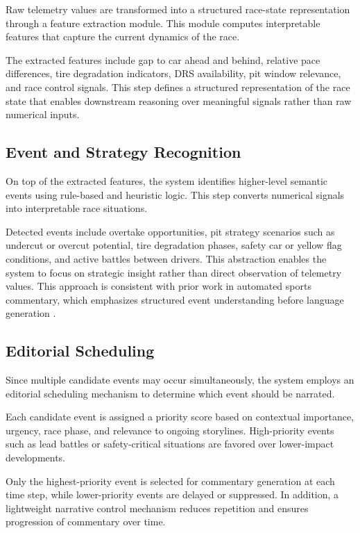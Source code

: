 Raw telemetry values are transformed into a structured race-state representation through a feature extraction module. This module computes interpretable features that capture the current dynamics of the race.

The extracted features include gap to car ahead and behind, relative pace differences, tire degradation indicators, DRS availability, pit window relevance, and race control signals. This step defines a structured representation of the race state that enables downstream reasoning over meaningful signals rather than raw numerical inputs.

\subsection{Event and Strategy Recognition}

On top of the extracted features, the system identifies higher-level semantic events using rule-based and heuristic logic. This step converts numerical signals into interpretable race situations.

Detected events include overtake opportunities, pit strategy scenarios such as undercut or overcut potential, tire degradation phases, safety car or yellow flag conditions, and active battles between drivers. This abstraction enables the system to focus on strategic insight rather than direct observation of telemetry values. This approach is consistent with prior work in automated sports commentary, which emphasizes structured event understanding before language generation \cite{AutoBaseComm,AutoBaskComm}.

\subsection{Editorial Scheduling}

Since multiple candidate events may occur simultaneously, the system employs an editorial scheduling mechanism to determine which event should be narrated.

Each candidate event is assigned a priority score based on contextual importance, urgency, race phase, and relevance to ongoing storylines. High-priority events such as lead battles or safety-critical situations are favored over lower-impact developments.

Only the highest-priority event is selected for commentary generation at each time step, while lower-priority events are delayed or suppressed. In addition, a lightweight narrative control mechanism reduces repetition and ensures progression of commentary over time.

